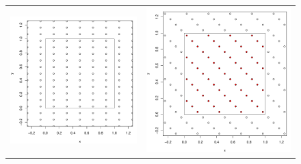 \documentclass{beamer}
\begin{document}
\begin{frame}
\begin{figure}
  \centering
  \begin{tabular}{cc}
    \begin{minipage}{0.4\textwidth}
      \centering
      \includegraphics[width=1\linewidth]{../nodes-1.pdf}
    \end{minipage}
    & \begin{minipage}{0.4\textwidth}
      \centering
      \includegraphics[width=1\linewidth]{../nodes-2.pdf}

\end{minipage}
\end{tabular}
\end{figure}
\end{frame}
\end{document}
